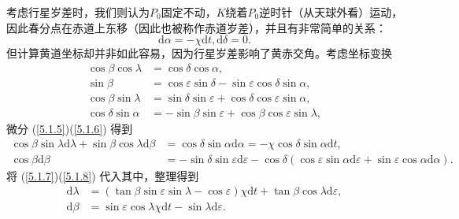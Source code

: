 \documentclass[11pt, a4paper, oneside]{ctexart}
\numberwithin{equation}{subsection}
\begin{document}
考虑行星岁差时，我们则认为$P_{0}$固定不动，$K$绕着$P_{0}$逆时针（从天球外看）运动，因此春分点在赤道上东移（因此也被称作赤道岁差），并且有非常简单的关系：
\begin{equation}
\mathrm{d}\alpha=-\chi\mathrm{d}t,\mathrm{d}\delta=0.
\end{equation}
但计算黄道坐标却并非如此容易，因为行星岁差影响了黄赤交角。考虑坐标变换
\begin{align}
\cos\beta\cos\lambda&=\cos\delta\cos\alpha,\label{5.1.5}\\
\sin\beta&=\cos\varepsilon\sin\delta-\sin\varepsilon\cos\delta\sin\alpha,\label{5.1.6}\\
\cos\beta\sin\lambda&=\sin\delta\sin\varepsilon+\cos\delta\cos\varepsilon\sin\alpha,\label{5.1.7}\\
\cos\delta\sin\alpha&=-\sin\beta\sin\varepsilon+\cos\beta\cos\varepsilon\sin\lambda,\label{5.1.8}
\end{align}
微分 (\ref{5.1.5})(\ref{5.1.6}) 得到
\begin{align}
\cos\beta\sin\lambda\mathrm{d}\lambda+\sin\beta\cos\lambda\mathrm{d}\beta&=\cos\delta{}\sin\alpha\mathrm{d}\alpha=-\chi\cos\delta{}\sin\alpha\mathrm{d}t,\\
\cos\beta\mathrm{d}\beta&=-\sin\delta{}\sin\varepsilon\mathrm{d}\varepsilon-\cos\delta{}\left(\cos\varepsilon\sin\alpha\mathrm{d}\varepsilon+\sin\varepsilon\cos\alpha\mathrm{d}\alpha\right).
\end{align}
将 (\ref{5.1.7})(\ref{5.1.8}) 代入其中，整理得到
\begin{align}
\mathrm{d}\lambda&=\left(\tan\beta\sin\varepsilon\sin\lambda-\cos\varepsilon\right)\chi\mathrm{d}t+\tan\beta\cos\lambda\mathrm{d}\varepsilon,\\
\mathrm{d}\beta&=\sin\varepsilon\cos\lambda\chi\mathrm{d}t-\sin\lambda\mathrm{d}\varepsilon.
\end{align}
\end{document}
